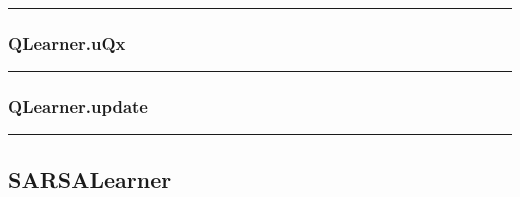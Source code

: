\begin{Shaded}
\begin{Highlighting}[]
\end{Highlighting}
\end{Shaded}

\begin{center}\rule{0.5\linewidth}{\linethickness}\end{center}

\hypertarget{qlearner.uqx}{%
\subsubsection{QLearner.uQx}\label{qlearner.uqx}}

\begin{Shaded}
\begin{Highlighting}[]
\end{Highlighting}
\end{Shaded}

\begin{center}\rule{0.5\linewidth}{\linethickness}\end{center}

\hypertarget{qlearner.update}{%
\subsubsection{QLearner.update}\label{qlearner.update}}

\begin{Shaded}
\begin{Highlighting}[]
\end{Highlighting}
\end{Shaded}

\begin{center}\rule{0.5\linewidth}{\linethickness}\end{center}

\hypertarget{sarsalearner}{%
\subsection{SARSALearner}\label{sarsalearner}}

\begin{Shaded}
\begin{Highlighting}[]
\end{Highlighting}
\end{Shaded}

